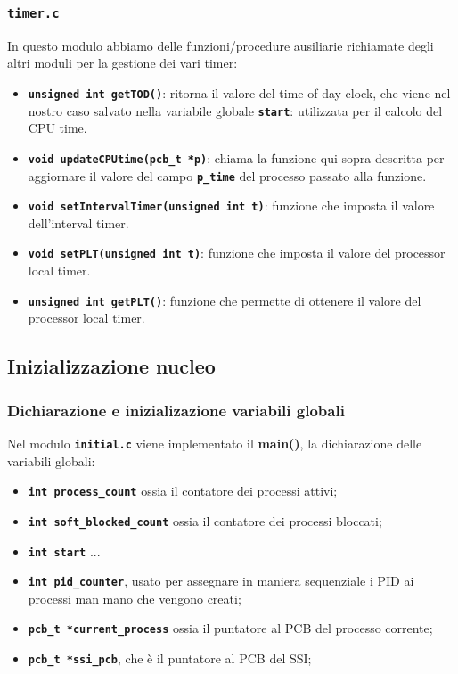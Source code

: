 \documentclass{article}
\begin{document}
\subsubsection{\texttt{\textbf{timer.c}}}
In questo modulo abbiamo delle funzioni/procedure ausiliarie richiamate degli altri moduli per la gestione dei vari timer:
\begin{itemize}
  \item \texttt{\textbf{unsigned int getTOD()}}: ritorna il valore del time of day clock, che viene nel nostro caso salvato nella variabile globale \texttt{\textbf{start}}: utilizzata per il calcolo del CPU time.
    \item \texttt{\textbf{void updateCPUtime(pcb\_t *p)}}: chiama la funzione qui sopra descritta per aggiornare il valore 
      del campo \texttt{\textbf{p\_time}} del processo passato alla funzione.
    \item \texttt{\textbf{void setIntervalTimer(unsigned int t)}}: funzione che imposta il valore dell'interval timer. 
    \item \texttt{\textbf{void setPLT(unsigned int t)}}: funzione che imposta il valore del processor local timer.
    \item \texttt{\textbf{unsigned int getPLT()}}: funzione che permette di ottenere il valore del processor local timer.
\end{itemize}

\subsection{Inizializzazione nucleo}
\subsubsection{Dichiarazione e inizializazione variabili globali}
Nel modulo \texttt{\textbf{initial.c}} viene implementato il \textbf{main()}, la dichiarazione delle variabili globali:
\begin{itemize}
    \item \texttt{\textbf{int process\_count}} ossia il contatore dei processi attivi;
    \item \texttt{\textbf{int soft\_blocked\_count}} ossia il contatore dei processi bloccati;
    \item \texttt{\textbf{int start}} ...
    \item \texttt{\textbf{int pid\_counter}}, usato per assegnare in maniera sequenziale i PID ai processi man mano che vengono creati;
    \item \texttt{\textbf{pcb\_t *current\_process}} ossia il puntatore al PCB del processo corrente;
    \item \texttt{\textbf{pcb\_t *ssi\_pcb}}, che è il puntatore al PCB del SSI;
    
\end{itemize}
\end{document}
